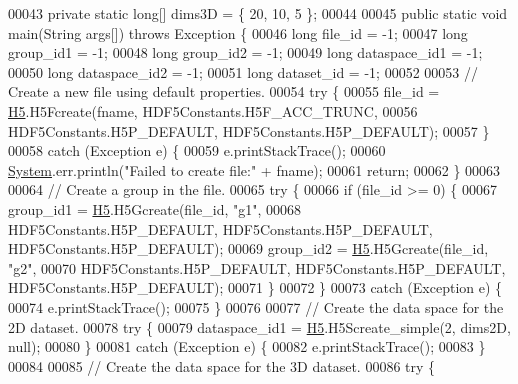 \begin{DoxyCode}
00043     \textcolor{keyword}{private} \textcolor{keyword}{static} \textcolor{keywordtype}{long}[] dims3D = \{ 20, 10, 5 \};
00044 
00045     \textcolor{keyword}{public} \textcolor{keyword}{static} \textcolor{keywordtype}{void} main(String args[]) \textcolor{keywordflow}{throws} Exception \{
00046         \textcolor{keywordtype}{long} file\_id = -1;
00047         \textcolor{keywordtype}{long} group\_id1 = -1;
00048         \textcolor{keywordtype}{long} group\_id2 = -1;
00049         \textcolor{keywordtype}{long} dataspace\_id1 = -1;
00050         \textcolor{keywordtype}{long} dataspace\_id2 = -1;
00051         \textcolor{keywordtype}{long} dataset\_id = -1;
00052 
00053         \textcolor{comment}{// Create a new file using default properties.}
00054         \textcolor{keywordflow}{try} \{
00055             file\_id = \hyperlink{namespace_h5}{H5}.H5Fcreate(fname, HDF5Constants.H5F\_ACC\_TRUNC,
00056                     HDF5Constants.H5P\_DEFAULT, HDF5Constants.H5P\_DEFAULT);
00057         \}
00058         \textcolor{keywordflow}{catch} (Exception e) \{
00059             e.printStackTrace();
00060             \hyperlink{namespace_system}{System}.err.println(\textcolor{stringliteral}{"Failed to create file:"} + fname);
00061             \textcolor{keywordflow}{return};
00062         \}
00063 
00064         \textcolor{comment}{// Create a group in the file.}
00065         \textcolor{keywordflow}{try} \{
00066             \textcolor{keywordflow}{if} (file\_id >= 0) \{
00067                 group\_id1 = \hyperlink{namespace_h5}{H5}.H5Gcreate(file\_id, \textcolor{stringliteral}{"g1"},
00068                         HDF5Constants.H5P\_DEFAULT, HDF5Constants.H5P\_DEFAULT, HDF5Constants.H5P\_DEFAULT);
00069                 group\_id2 = \hyperlink{namespace_h5}{H5}.H5Gcreate(file\_id, \textcolor{stringliteral}{"g2"},
00070                         HDF5Constants.H5P\_DEFAULT, HDF5Constants.H5P\_DEFAULT, HDF5Constants.H5P\_DEFAULT);
00071             \}
00072         \}
00073         \textcolor{keywordflow}{catch} (Exception e) \{
00074             e.printStackTrace();
00075         \}
00076 
00077         \textcolor{comment}{// Create the data space for the  2D dataset.}
00078         \textcolor{keywordflow}{try} \{
00079             dataspace\_id1 = \hyperlink{namespace_h5}{H5}.H5Screate\_simple(2, dims2D, null);
00080         \}
00081         \textcolor{keywordflow}{catch} (Exception e) \{
00082             e.printStackTrace();
00083         \}
00084 
00085         \textcolor{comment}{// Create the data space for the  3D dataset.}
00086         \textcolor{keywordflow}{try} \{

\end{DoxyCode}
